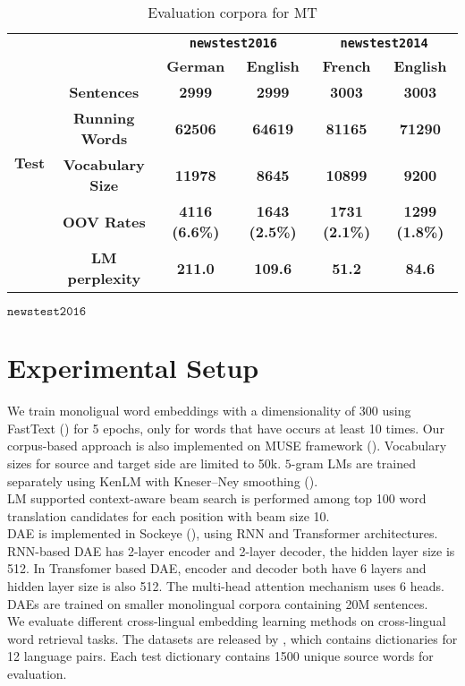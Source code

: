 \begin{table}[H]
	\centering
	
	\begin{tabular}{c|c|c|c|c|c}
		\hline
		\multirow{7}{*}{\textbf{Test}} & \textbf{}                      & \multicolumn{2}{c|}{\textbf{\texttt{newstest2016}}}    & \multicolumn{2}{c}{\textbf{\texttt{newstest2014}}}    \\ \cline{3-6} 
		& \multicolumn{1}{l|}{\textbf{}} & \textbf{German}       & \textbf{English}      & \textbf{French}       & \textbf{English}      \\ \cline{2-6} 
		& \textbf{Sentences}             & \textbf{2999}         & \textbf{2999}         & \textbf{3003}         & \textbf{3003}         \\ \cline{2-6} 
		& \textbf{Running Words}         & \textbf{62506}        & \textbf{64619}        & \textbf{81165}        & \textbf{71290}        \\ \cline{2-6} 
		& \textbf{Vocabulary Size}       & \textbf{11978}        & \textbf{8645}         & \textbf{10899}        & \textbf{9200}         \\ \cline{2-6} 
		& \textbf{OOV Rates}             & \textbf{4116 (6.6\%)} & \textbf{1643 (2.5\%)} & \textbf{1731 (2.1\%)} & \textbf{1299 (1.8\%)} \\ \cline{2-6} 
		& \textbf{LM perplexity}         & \textbf{211.0}        & \textbf{109.6}        & \textbf{51.2}         & \textbf{84.6}         \\ \hline
		
	\end{tabular}$\texttt{newstest2016}$
	\caption{Evaluation corpora for MT}
\end{table}

\section{Experimental Setup}
We train monoligual word embeddings with a dimensionality of 300 using FastText (\cite{DBLP:journals/corr/BojanowskiGJM16}) for 5 epochs, only for words that have occurs at least 10 times. Our corpus-based approach is also implemented on MUSE framework (\cite{DBLP:journals/corr/abs-1710-04087}). Vocabulary sizes for source and target side are limited to 50k.
$5$-gram LMs are trained separately using KenLM with Kneser–Ney smoothing (\cite{heafield2011kenlm}).\\
LM supported context-aware beam search is performed among top 100 word translation candidates for each position with beam size 10.\\
DAE is implemented in Sockeye (\cite{hieber2017sockeye}), using RNN and Transformer architectures. RNN-based DAE has 2-layer encoder and 2-layer decoder, the hidden layer size is 512. In Transfomer based DAE, encoder and decoder both have 6 layers and hidden layer size is also 512. The multi-head attention mechanism uses 6 heads. DAEs are trained on smaller monolingual corpora containing 20M sentences. \\
We evaluate different cross-lingual embedding learning methods on cross-lingual word retrieval tasks. The datasets are released by \cite{}, which contains dictionaries for 12 language pairs. Each test dictionary contains 1500 unique source words for evaluation.  
